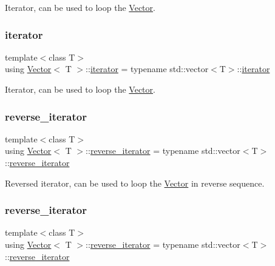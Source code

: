 Iterator, can be used to loop the \hyperlink{classVector}{Vector}. \mbox{\label{classVector_a45531016f99e90887e0f890f2da943e4}} 
\subsubsection{\texorpdfstring{iterator}{iterator}\hspace{0.1cm}{\footnotesize\ttfamily [2/2]}}
{\footnotesize\ttfamily template$<$class T$>$ \\
using \hyperlink{classVector}{Vector}$<$ T $>$\+::\hyperlink{classVector_a45531016f99e90887e0f890f2da943e4}{iterator} =  typename std\+::vector$<$T$>$\+::\hyperlink{classVector_a45531016f99e90887e0f890f2da943e4}{iterator}}

Iterator, can be used to loop the \hyperlink{classVector}{Vector}. \mbox{\label{classVector_a6afe8339bd8b2187c173c0f46bbd7d63}} 
\subsubsection{\texorpdfstring{reverse\+\_\+iterator}{reverse\_iterator}\hspace{0.1cm}{\footnotesize\ttfamily [1/2]}}
{\footnotesize\ttfamily template$<$class T$>$ \\
using \hyperlink{classVector}{Vector}$<$ T $>$\+::\hyperlink{classVector_a6afe8339bd8b2187c173c0f46bbd7d63}{reverse\+\_\+iterator} =  typename std\+::vector$<$T$>$\+::\hyperlink{classVector_a6afe8339bd8b2187c173c0f46bbd7d63}{reverse\+\_\+iterator}}

Reversed iterator, can be used to loop the \hyperlink{classVector}{Vector} in reverse sequence. \mbox{\label{classVector_a6afe8339bd8b2187c173c0f46bbd7d63}} 
\subsubsection{\texorpdfstring{reverse\+\_\+iterator}{reverse\_iterator}\hspace{0.1cm}{\footnotesize\ttfamily [2/2]}}
{\footnotesize\ttfamily template$<$class T$>$ \\
using \hyperlink{classVector}{Vector}$<$ T $>$\+::\hyperlink{classVector_a6afe8339bd8b2187c173c0f46bbd7d63}{reverse\+\_\+iterator} =  typename std\+::vector$<$T$>$\+::\hyperlink{classVector_a6afe8339bd8b2187c173c0f46bbd7d63}{reverse\+\_\+iterator}}

